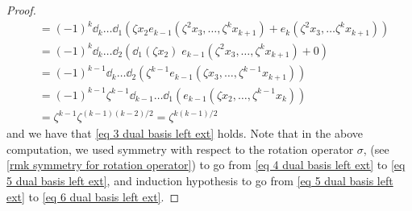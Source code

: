 \begin{proof}
\begin{align}
        &\nonumber= (-1)^k\dd_k \ldots \dd_1
        \left(
         \zeta x_2 e_{k-1}(\zeta^2x_3,\ldots, \zeta^kx_{k+1})
        +e_{k}(\zeta^2x_3, \ldots \zeta^k x_{k+1})        
        \right) \\
        &\nonumber=(-1)^k\dd_k\ldots\dd_2\left(\dd_1(\zeta x_2)\;e_{k-1}(\zeta^2x_3, \ldots, \zeta^kx_{k+1}) + 0\right)\\
        &=(-1)^{k-1}\dd_k\ldots \dd_2\left(\zeta^{k-1}e_{k-1}(\zeta x_3, \ldots, \zeta^{k-1} x_{k+1})\right)\label{eq 4 dual basis left ext}\\
        &=(-1)^{k-1}\zeta^{k-1}\dd_{k-1}\ldots \dd_1\left(e_{k-1}(\zeta x_2, \ldots, \zeta^{k-1} x_{k})\right) \label{eq 5 dual basis left ext} \\
        &=\zeta^{k-1} \zeta^{(k-1)(k-2)/2}=\zeta^{k(k-1)/2} \label{eq 6 dual basis left ext}
    \end{align}
    and we have that \cref{eq 3 dual basis left ext} holds. Note that in the above computation, we used symmetry with respect to the rotation operator $\sigma$, (see \cref{rmk symmetry for rotation operator}) to go from \eqref{eq 4 dual basis left ext} to \eqref{eq 5 dual basis left ext}, and induction hypothesis to go from \eqref{eq 5 dual basis left ext} to \eqref{eq 6 dual basis left ext}.


\end{proof}
